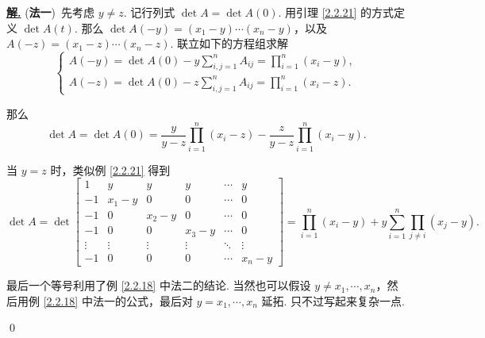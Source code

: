\documentclass[10pt,openany]{article}
\theoremstyle{thmstyle} %
\theoremstyle{defstyle} %
\theoremstyle{prostyle} %
\theoremstyle{exastyle}
\theoremstyle{remstyle}
\newenvironment{solution}{\par\underline{\textbf{解.}} \;\fangsong}{\qed\par}
\begin{document}
\begin{solution}
	(\textbf{法一})\ 先考虑 \( y \neq z \). 记行列式 \( \det A=\det A(0) \). 用引理 \ref{2.2.21} 的方式定义 \( \det A(t) \). 那么 \( \det A(-y)=(x_1-y)\cdots (x_n-y) \)，以及 \( A(-z)= (x_1-z)\cdots (x_n-z) \). 联立如下的方程组求解
	\[ \left\{ \begin{array}{l}
		A(-y)=\det A(0)- y \sum_{i,j=1}^{n} A_{ij}= \prod_{i=1}^{n} (x_i-y), \\
		A(-z)=\det A(0)- z\sum_{i,j=1}^{n} A_{ij}= \prod_{i=1}^{n} (x_i-z).
	\end{array}\right. \]
	
	那么 
	\[ \det A= \det A(0)= \frac{y}{y-z} \prod_{i=1}^{n} (x_i-z)- \frac{z}{y-z} \prod_{i=1}^{n} (x_i-y). \]
	
	当 \( y=z \) 时，类似例 \ref{2.2.21} 得到
	\[ \det A=\det \begin{bmatrix}
		1 & y & y & y & \cdots & y \\
		-1 & x_1-y & 0 & 0 & \cdots & 0 \\
		-1 & 0 & x_2-y & 0 & \cdots & 0 \\
		-1 & 0 & 0 & x_3-y & \cdots & 0 \\
		\vdots & \vdots & \vdots & \vdots & \ddots & \vdots \\
		-1 & 0 & 0 & 0 & \cdots & x_n-y
	\end{bmatrix}=\prod_{i=1}^{n}(x_i-y)+y\sum_{i=1}^{n} \prod_{j \neq i}^{} (x_j-y).   \]
	
	最后一个等号利用了例 \ref{2.2.18} 中法二的结论. 当然也可以假设 \( y \neq x_1,\cdots,x_n \)，然后用例 \ref{2.2.18} 中法一的公式，最后对 \( y=x_1,\cdots,x_n \) 延拓. 只不过写起来复杂一点.
	
	\vspace{2ex}
	

\end{solution}
\end{document}
